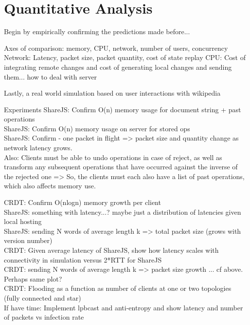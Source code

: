 \documentclass[12pt,a4paper,twoside,openright]{report}
\begin{document}
	
	
	
	\section{Quantitative Analysis}
	
		Begin by empirically confirming the predictions made before... 
		
		Axes of comparison: memory, CPU, network, number of users, concurrency
			Network: Latency, packet size, packet quantity, cost of state replay
			CPU: Cost of integrating remote changes and cost of generating local changes and sending them... how to deal with server
			
		
			
		Lastly, a real world simulation based on user interactions with wikipedia
		
		
		Experiments
			ShareJS: Confirm O(n) memory usage for document string + past operations \\
			ShareJS: Confirm O(n) memory usage on server for stored ops\\
			ShareJS: Confirm - one packet in flight => packet size and quantity change as network latency grows. \\
						Also: Clients must be able to undo operations in case of reject, as well as transform any subsequent operations that have occurred against the inverse of the rejected one => So, the clients must each also have a list of past operations, which also affects memory use.
						
			CRDT:	 Confirm O(nlogn) memory growth per client\\
			
			ShareJS: something with latency...? maybe just a distribution of latencies given local hosting\\
			ShareJS: sending N words of average length k => total packet size (grows with version number)\\
			CRDT: 	 Given average latency of ShareJS, show how latency scales with connectivity in simulation versus 2*RTT for ShareJS\\
			CRDT:	 sending N words of average length k => packet size growth ... cf above. Perhaps same plot?\\
			CRDT: 	 Flooding as a function as number of clients at one or two topologies (fully connected and star)\\
			
			If have time: Implement lpbcast and anti-entropy and show latency and number of packets vs infection rate\\
			
\end{document}
